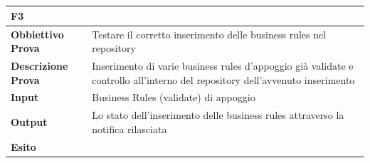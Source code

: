 \documentclass[11pt,titlepage,a4paper]{report}
\begin{document}
\\
\\
\begin{tabular}{||p{4.5cm}||p{7.5cm}||}
\hline
\textbf{\textsf{F3}}& \\
\hline
{\textbf {Obbiettivo Prova}}& Testare il corretto inserimento delle business rules nel repository\\ \hline
{\textbf{Descrizione Prova}}&  Inserimento di varie business rules d'appoggio gi\`a validate e controllo all'interno del repository dell'avvenuto inserimento\\ \hline
{\textbf{Input}}& Business Rules (validate) di appoggio \\ \hline
{\textbf{Output}}& Lo stato dell'inserimento delle business rules attraverso la notifica rilasciata \\ \hline
{\textbf{Esito}}&  \\ \hline
\end{tabular} \\
\\
\\
\end{document}
